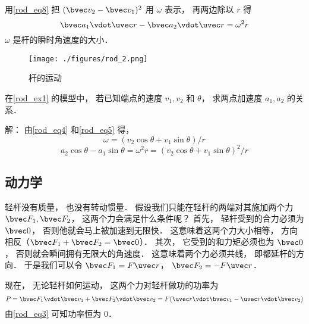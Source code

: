 用\autoref{rod_eq8} 把 $(\bvec v_2 - \bvec v_1)^2$ 用 $\omega$ 表示， 再两边除以 $r$ 得
\begin{equation}\label{rod_eq5}
\bvec a_1 \vdot \uvec r - \bvec a_2 \vdot \uvec r  = \omega^2 r
\end{equation}
$\omega$ 是杆的瞬时角速度的大小．

\begin{example}{}
\begin{figure}[ht]
\centering
\texttt{[image: ./figures/rod\_2.png]}
\caption{杆的运动} \label{rod_fig2}
\end{figure}
在\autoref{rod_ex1} 的模型中， 若已知端点的速度 $v_1, v_2$ 和 $\theta$， 求两点加速度 $a_1, a_2$ 的关系．

解： 由\autoref{rod_eq4} 和\autoref{rod_eq5} 得，
\begin{equation}
\omega = (v_2 \cos\theta + v_1 \sin\theta)/r
\end{equation}
\begin{equation}
a_2 \cos\theta - a_1 \sin\theta = \omega^2 r = (v_2 \cos\theta + v_1 \sin\theta)^2/r
\end{equation}
\end{example}

\subsection{动力学}
轻杆没有质量， 也没有转动惯量． 假设我们只能在轻杆的两端对其施加两个力 $\bvec F_1, \bvec F_2$， 这两个力会满足什么条件呢？ 首先， 轻杆受到的合力必须为 $\bvec 0$， 否则他就会马上被加速到无限快． 这意味着这两个力大小相等， 方向相反（$\bvec F_1 + \bvec F_2 = \bvec 0$）． 其次， 它受到的和力矩必须也为 $\bvec 0$， 否则就会瞬间拥有无限大的角速度． 这意味着两个力必须共线， 即都延杆的方向． 于是我们可以令 $\bvec F_1 = F \uvec r$， $\bvec F_2 = -F \uvec r$．

现在， 无论轻杆如何运动， 这两个力对轻杆做功的功率为
\begin{equation}
P = \bvec F_1 \vdot \bvec v_1 + \bvec F_2 \vdot \bvec v_2 = F (\uvec r \vdot \bvec v_1 - \uvec r \vdot \bvec v_2)
\end{equation}
由\autoref{rod_eq3} 可知功率恒为 0．
